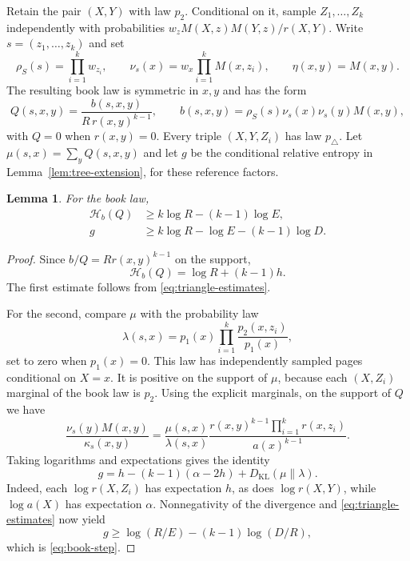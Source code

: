 \documentclass[11pt,a4paper]{article}
\newtheorem{lemma}[theorem]{Lemma}
\theoremstyle{remark}
\numberwithin{equation}{section}
\begin{document}
Retain the pair $(X,Y)$ with law $p_2$. Conditional on it,
sample $Z_1,\ldots,Z_k$ independently with probabilities
$w_zM(X,z)M(Y,z)/r(X,Y)$. Write $s=(z_1,\ldots,z_k)$ and set
\[
 \rho_S(s)=\prod_{i=1}^kw_{z_i},\qquad
 \nu_s(x)=w_x\prod_{i=1}^kM(x,z_i),\qquad \eta(x,y)=M(x,y).
\]
The resulting book law is symmetric in $x,y$ and has the form
\begin{equation}\label{eq:book-law}
 Q(s,x,y)=\frac{b(s,x,y)}{R\,r(x,y)^{k-1}},\qquad
 b(s,x,y)=\rho_S(s)\nu_s(x)\nu_s(y)M(x,y),
\end{equation}
with $Q=0$ when $r(x,y)=0$. Every triple $(X,Y,Z_i)$ has
law $p_\triangle$. Let $\mu(s,x)=\sum_yQ(s,x,y)$ and let $g$
be the conditional relative entropy in
Lemma~\ref{lem:tree-extension}, for these reference factors.

\begin{lemma}\label{lem:book}
For the book law,
\begin{align}
 \mathcal H_b(Q)&\geq k\log R-(k-1)\log E,
                                      \label{eq:book-total}\\
 g&\geq k\log R-\log E-(k-1)\log D.
                                      \label{eq:book-step}
\end{align}
\end{lemma}
\begin{proof}
Since $b/Q=Rr(x,y)^{k-1}$ on the support,
\[
 \mathcal H_b(Q)=\log R+(k-1)h.
\]
The first estimate follows from \eqref{eq:triangle-estimates}.

For the second, compare $\mu$ with the probability law
\[
 \lambda(s,x)=p_1(x)\prod_{i=1}^k\frac{p_2(x,z_i)}{p_1(x)},
\]
set to zero when $p_1(x)=0$. This law has independently sampled
pages conditional on $X=x$. It is positive on the support of
$\mu$, because each $(X,Z_i)$ marginal of the book law is $p_2$.
Using the explicit marginals, on the support of $Q$ we have
\[
 \frac{\nu_s(y)M(x,y)}{\kappa_s(x,y)}
 =\frac{\mu(s,x)}{\lambda(s,x)}
   \frac{r(x,y)^{k-1}\prod_{i=1}^kr(x,z_i)}{a(x)^{k-1}}.
\]
Taking logarithms and expectations gives the identity
\begin{equation}\label{eq:pages-kl}
 g=h-(k-1)(\alpha-2h)+D_{\mathrm{KL}}(\mu\|\lambda).
\end{equation}
Indeed, each $\log r(X,Z_i)$ has expectation $h$, as does
$\log r(X,Y)$, while $\log a(X)$ has expectation $\alpha$.
Nonnegativity of the divergence and
\eqref{eq:triangle-estimates} now yield
\[
 g\geq\log(R/E)-(k-1)\log(D/R),
\]
which is \eqref{eq:book-step}.
\end{proof}
\end{document}
